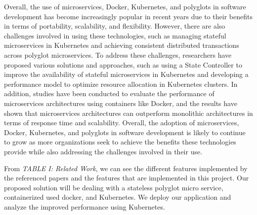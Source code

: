 Overall, the use of microservices, Docker, Kubernetes, and polyglots in software development has become increasingly popular in recent years due to their benefits in terms of portability, scalability, and flexibility. However, there are also challenges involved in using these technologies, such as managing stateful microservices in Kubernetes and achieving consistent distributed transactions across polyglot microservices. To address these challenges, researchers have proposed various solutions and approaches, such as using a State Controller to improve the availability of stateful microservices in Kubernetes and developing a performance model to optimize resource allocation in Kubernetes clusters. In addition, studies have been conducted to evaluate the performance of microservices architectures using containers like Docker, and the results have shown that microservices architectures can outperform monolithic architectures in terms of response time and scalability. Overall, the adoption of microservices, Docker, Kubernetes, and polyglots in software development is likely to continue to grow as more organizations seek to achieve the benefits these technologies provide while also addressing the challenges involved in their use.

From \emph{TABLE I: Related Work}, we can see the different features implemented by the referenced papers and the features that are implemented in this project.
Our proposed solution will be dealing with a stateless polyglot micro service, containerized used docker, and Kubernetes. We deploy our application and analyze the improved performance using Kubernetes.

\begin{table}[h]
\caption{Related Work}
\end{table}
